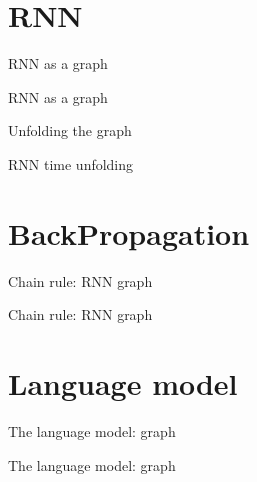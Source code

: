 \documentclass[10pt]{beamer}
\begin{document}
\nocite{DeepLearningbook}


\maketitle



\section{RNN}

\begin{frame}{RNN as a graph}

\end{frame}

\begin{frame}{RNN as a graph}

\end{frame}

\begin{frame}{Unfolding the graph}

\end{frame}

\begin{frame}{RNN time unfolding}

\end{frame}


\section{BackPropagation}

\begin{frame}{Chain rule: RNN graph}

\end{frame}

\begin{frame}{Chain rule: RNN graph}

\end{frame}

\section{Language model}

\begin{frame}{The language model: graph}

\end{frame}

\begin{frame}{The language model: graph}

\end{frame}
\end{document}
